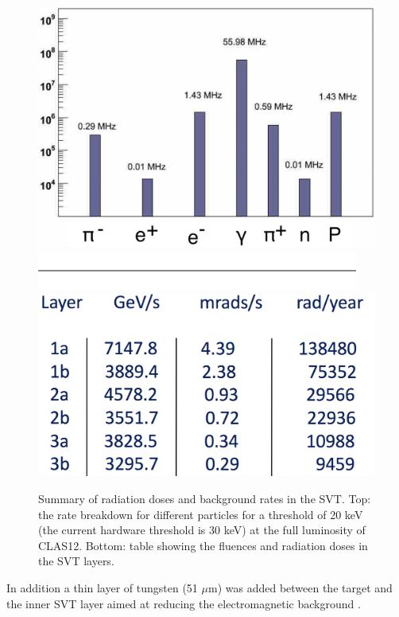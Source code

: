 \begin{figure}
	\centering
	\includegraphics[width=0.99\columnwidth,keepaspectratio]{img/bstRates.png}
	\includegraphics[width=0.99\columnwidth,keepaspectratio]{img/blank.png}
	\includegraphics[width=0.99\columnwidth,keepaspectratio]{img/bstRadSummary.png}
	\caption{Summary of radiation doses and background rates in the SVT. Top: the rate breakdown for different particles
             for a threshold of 20 keV (the current hardware threshold is 30 keV) at the full luminosity of CLAS12.
             Bottom: table showing the fluences and radiation doses in the SVT layers. }
	\label{fig:radStudy}
\end{figure}

In addition a thin layer of tungsten (51 $\mu$m) was added between the target and the inner SVT layer aimed at reducing the electromagnetic
background \cite{bstDose}.





